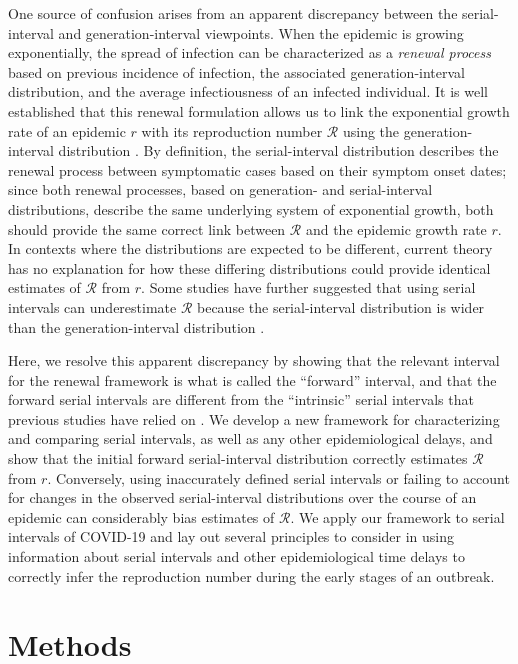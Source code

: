 \documentclass[12pt]{article}
\newcommand{\RR}{\ensuremath{{\mathcal R}}\xspace}
\begin{document}
One source of confusion arises from an apparent discrepancy between the serial-interval and generation-interval viewpoints.
When the epidemic is growing exponentially, the spread of infection can be characterized as a \emph{renewal process} based on previous incidence of infection, the associated generation-interval distribution, and the average infectiousness of an infected individual.
It is well established that this renewal formulation allows us to link the exponential growth rate of an epidemic $r$ with its reproduction number \RR using the generation-interval distribution \citep{wallinga2007generation}.
By definition, the serial-interval distribution describes the renewal process between symptomatic cases based on their symptom onset dates;
since both renewal processes, based on generation- and serial-interval distributions, describe the same underlying system of exponential growth, both should provide the same correct link between \RR and the epidemic growth rate $r$.
In contexts where the distributions are expected to be different, current theory has no explanation for how these differing distributions could provide identical estimates of \RR from $r$. 
Some studies have further suggested that using serial intervals can underestimate \RR because the serial-interval distribution is wider than the generation-interval distribution \citep{britton2019estimation, ganyani2020estimating}.

Here, we resolve this apparent discrepancy by showing that the relevant interval for the renewal framework is what is called the ``forward'' interval, and that the forward serial intervals are different from the ``intrinsic'' serial intervals that previous studies have relied on \citep{svensson2007note,klinkenberg2011correlation,te2013estimating,champredon2018equivalence, britton2019estimation}.
We develop a new framework for characterizing and comparing serial intervals, as well as any other epidemiological delays, and show that the initial forward serial-interval distribution correctly estimates \RR from $r$.
Conversely, using inaccurately defined serial intervals or failing to account for changes in the observed serial-interval distributions over the course of an epidemic can considerably bias estimates of \RR.
We apply our framework to serial intervals of COVID-19 and lay out several principles to consider in using information about serial intervals and other epidemiological time delays to correctly infer the reproduction number during the early stages of an outbreak.

\section{Methods}
\end{document}
